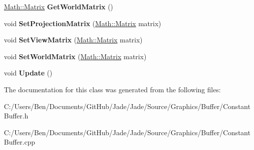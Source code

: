 \begin{DoxyCompactItemize}
\item 
\hypertarget{class_jade_1_1_graphics_1_1_constant_buffer_acc35ad00eebefcf0c1acba3f3e9098a0}{}\hyperlink{struct_jade_1_1_math_1_1_matrix}{Math\+::\+Matrix} {\bfseries Get\+World\+Matrix} ()\label{class_jade_1_1_graphics_1_1_constant_buffer_acc35ad00eebefcf0c1acba3f3e9098a0}

\item 
\hypertarget{class_jade_1_1_graphics_1_1_constant_buffer_a6ed74ad4f66dbf1c4f847ae357b79ffb}{}void {\bfseries Set\+Projection\+Matrix} (\hyperlink{struct_jade_1_1_math_1_1_matrix}{Math\+::\+Matrix} matrix)\label{class_jade_1_1_graphics_1_1_constant_buffer_a6ed74ad4f66dbf1c4f847ae357b79ffb}

\item 
\hypertarget{class_jade_1_1_graphics_1_1_constant_buffer_ad4f88dc807edbf3ab10f359afe3c51de}{}void {\bfseries Set\+View\+Matrix} (\hyperlink{struct_jade_1_1_math_1_1_matrix}{Math\+::\+Matrix} matrix)\label{class_jade_1_1_graphics_1_1_constant_buffer_ad4f88dc807edbf3ab10f359afe3c51de}

\item 
\hypertarget{class_jade_1_1_graphics_1_1_constant_buffer_ac804e9304100e73632757caced9376ae}{}void {\bfseries Set\+World\+Matrix} (\hyperlink{struct_jade_1_1_math_1_1_matrix}{Math\+::\+Matrix} matrix)\label{class_jade_1_1_graphics_1_1_constant_buffer_ac804e9304100e73632757caced9376ae}

\item 
\hypertarget{class_jade_1_1_graphics_1_1_constant_buffer_a8b920fb40abb313d36170077dc24fdab}{}void {\bfseries Update} ()\label{class_jade_1_1_graphics_1_1_constant_buffer_a8b920fb40abb313d36170077dc24fdab}

\end{DoxyCompactItemize}


The documentation for this class was generated from the following files\+:\begin{DoxyCompactItemize}
\item 
C\+:/\+Users/\+Ben/\+Documents/\+Git\+Hub/\+Jade/\+Jade/\+Source/\+Graphics/\+Buffer/Constant\+Buffer.\+h\item 
C\+:/\+Users/\+Ben/\+Documents/\+Git\+Hub/\+Jade/\+Jade/\+Source/\+Graphics/\+Buffer/Constant\+Buffer.\+cpp\end{DoxyCompactItemize}
